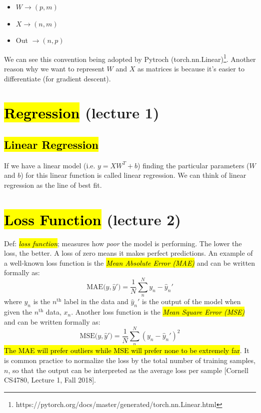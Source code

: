 \documentclass[11pt]{article}
\newcommand{\hlinfo}[1]{{\sethlcolor{lavender}\hl{#1}}}
\begin{document}
\begin{itemize}
    \item {$W \rightarrow (p,m)$}
    \item {$X \rightarrow (n,m)$}
    \item {Out $\rightarrow (n,p)$}
\end{itemize}

We can see this convention being adopted by Pytroch (torch.nn.Linear)\footnote{https://pytorch.org/docs/master/generated/torch.nn.Linear.html}. Another reason why we want to represent $W$ and $X$ as matrices is because it's easier to differentiate (for gradient descent). 

\section{\hl{Regression} (lecture 1)}

\subsection{\hl{Linear Regression}}

If we have a linear model (i.e. $y=XW^T+b$) finding the particular parameters ($W$ and $b$) for this linear function is called linear regression. We can think of linear regression as the line of best fit. 

\section{\hl{Loss Function} (lecture 2)}

Def: \hl{\emph{loss function}}; measures how \emph{poor} the model is performing. The lower the loss, the better. A loss of zero means it makes perfect predictions. An example of a well-known loss function is the \hlinfo{\emph{Mean Absolute Error (MAE)}} and can be written formally as:
\[\text{MAE($y, \hat{y}'$)} = \frac{1}{N}\sum_{n}^{N}{y_n - \hat{y}_n'}\]
where $y_n$ is the $n^{\text{th}}$ label in the data and $\hat{y}_n'$ is the output of the model when given the $n^{\text{th}}$ data, $x_n$. Another loss function is the \hlinfo{\emph{Mean Square Error (MSE)}} and can be written formally as:
\[\text{MSE($y, \hat{y}'$)} = \frac{1}{N}\sum_{n}^{N}{(y_n - \hat{y}_n')^2}\]
\hlinfo{The MAE will prefer outliers while MSE will prefer none to be extremely far}. It is common practice to normalize the loss by the total number of training samples, $n$, so that the output can be interpreted as the average loss per sample [Cornell CS4780, Lecture 1, Fall 2018].
\end{document}
